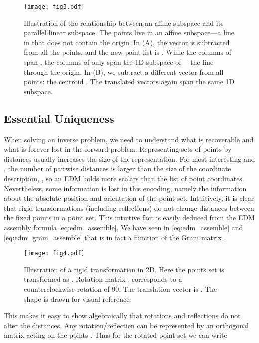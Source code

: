 \documentclass[10pt,double]{IEEEtran}
\DeclareRobustCommand{\mtx}{\texorpdfstring{}{0 \ 1; -1 0}}
\begin{document}
\begin{figure}
\centering
\texttt{[image: fig3.pdf]}
\caption{Illustration of the relationship between an affine subspace and its
parallel linear subspace. The points  live in an
affine subspace---a line in  that does not contain the origin. In (A),
the vector  is subtracted from all the points, and the new point list
is . While the
columns of  span , the columns of  only span the 1D subspace
of ---the line through the origin. In (B), we subtract a different
vector from all points: the centroid . The translated vectors  again span
the same 1D subspace.}
\label{fig:affine}
\end{figure}



\subsection{Essential Uniqueness} \label{sub:essential_uniqueness}

When solving an inverse problem, we need to understand what is recoverable and
what is forever lost in the forward problem. Representing sets of points by
distances usually increases the size of the representation. For most
interesting  and , the number of pairwise distances is larger than the
size of the coordinate description, , so an EDM holds
more scalars than the list of point coordinates. Nevertheless, some
information is lost in this encoding, namely the information about the
absolute position and orientation of the point set. Intuitively, it is clear
that rigid transformations (including reflections) do not change distances
between the fixed points in a point set. This intuitive fact is easily deduced
from the EDM assembly formula \eqref{eq:edm_assemble}. We have seen in
\eqref{eq:edm_assemble} and \eqref{eq:edm_gram_assemble} that  is
in fact a function of the Gram matrix .

\begin{figure}[t]
\centering
\texttt{[image: fig4.pdf]}
\caption{Illustration of a rigid transformation in 2D. Here the points set is
transformed as . Rotation matrix \mtx,
corresponds to a counterclockwise rotation of 90. The translation
vector is . The shape is drawn for visual reference.}
\label{fig:procrustes}
\end{figure}


This makes it easy to show algebraically that rotations and
reflections do not alter the distances. Any rotation/reflection can be
represented by an orthogonal matrix  acting on the
points . Thus for the rotated point set  we can write
\end{document}

